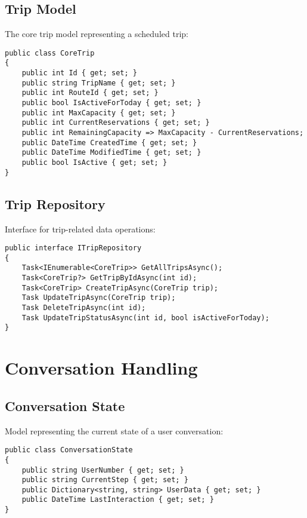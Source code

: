 \subsection{Trip Model}
The core trip model representing a scheduled trip:

\begin{lstlisting}[language=CSharp]
public class CoreTrip
{
    public int Id { get; set; }
    public string TripName { get; set; }
    public int RouteId { get; set; }
    public bool IsActiveForToday { get; set; }
    public int MaxCapacity { get; set; }
    public int CurrentReservations { get; set; }
    public int RemainingCapacity => MaxCapacity - CurrentReservations;
    public DateTime CreatedTime { get; set; }
    public DateTime ModifiedTime { get; set; }
    public bool IsActive { get; set; }
}
\end{lstlisting}

\subsection{Trip Repository}
Interface for trip-related data operations:

\begin{lstlisting}[language=CSharp]
public interface ITripRepository
{
    Task<IEnumerable<CoreTrip>> GetAllTripsAsync();
    Task<CoreTrip?> GetTripByIdAsync(int id);
    Task<CoreTrip> CreateTripAsync(CoreTrip trip);
    Task UpdateTripAsync(CoreTrip trip);
    Task DeleteTripAsync(int id);
    Task UpdateTripStatusAsync(int id, bool isActiveForToday);
}
\end{lstlisting}

\section{Conversation Handling}

\subsection{Conversation State}
Model representing the current state of a user conversation:

\begin{lstlisting}[language=CSharp]
public class ConversationState
{
    public string UserNumber { get; set; }
    public string CurrentStep { get; set; }
    public Dictionary<string, string> UserData { get; set; }
    public DateTime LastInteraction { get; set; }
}
\end{lstlisting}

